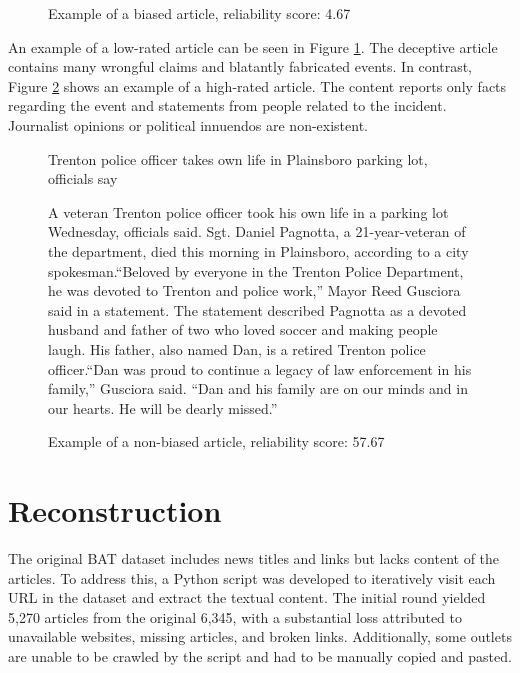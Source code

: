 \begin{figure}[htbp]
\begin{minipage}{0.9\linewidth}
    \end{minipage}
    \caption{Example of a biased article, reliability score: 4.67}
    \label{fig:example-biased-article-1}
\end{figure}

An example of a low-rated article can be seen in Figure \ref{fig:example-biased-article-1}. The deceptive article contains many wrongful claims and blatantly fabricated events. In contrast, Figure \ref{fig:example-nonbiased-article-1} shows an example of a high-rated article. The content reports only facts regarding the event and statements from people related to the incident. Journalist opinions or political innuendos are non-existent.


\begin{figure}[htbp]
    \centering
    \begin{minipage}{0.9\linewidth}
        \begin{center}
            \small{Trenton police officer takes own life in Plainsboro parking lot, officials say}
        \end{center}
        \scriptsize{
            A veteran Trenton police officer took his own life in a parking lot Wednesday, officials said. Sgt. Daniel Pagnotta, a 21-year-veteran of the department, died this morning in Plainsboro, according to a city spokesman.“Beloved by everyone in the Trenton Police Department, he was devoted to Trenton and police work,” Mayor Reed Gusciora said in a statement. The statement described Pagnotta as a devoted husband and father of two who loved soccer and making people laugh. His father, also named Dan, is a retired Trenton police officer.“Dan was proud to continue a legacy of law enforcement in his family,” Gusciora said. “Dan and his family are on our minds and in our hearts. He will be dearly missed.”}
    \end{minipage}
    \caption{Example of a non-biased article, reliability score: 57.67}
    \label{fig:example-nonbiased-article-1}
\end{figure}

\section{Reconstruction}

The original BAT dataset includes news titles and links but lacks content of the articles. To address this, a Python script was developed to iteratively visit each URL in the dataset and extract the textual content. The initial round yielded 5,270 articles from the original 6,345, with a substantial loss attributed to unavailable websites, missing articles, and broken links. Additionally, some outlets are unable to be crawled by the script and had to be manually copied and pasted.

